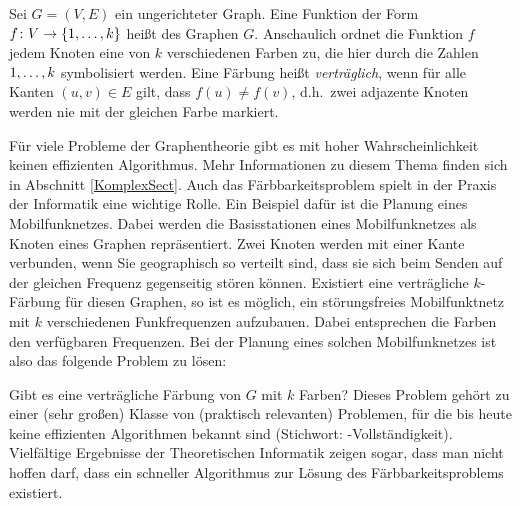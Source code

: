 \begin{definition}
Sei $G = (V,E)$ ein ungerichteter Graph. Eine Funktion der Form
$f \colon V \rightarrow \{1, \dots ,k\}$
heißt  des Graphen $G$. Anschaulich
ordnet die Funktion $f$ jedem Knoten eine von $k$ verschiedenen Farben
zu, die hier durch die Zahlen $1, \dots ,k$ symbolisiert werden. Eine
Färbung heißt \emph{verträglich}, wenn für
alle Kanten $(u,v) \in E$ gilt, dass $f(u) \neq f(v)$, d.h.~zwei
adjazente Knoten werden nie mit der gleichen Farbe markiert.
\end{definition}

\ifkomplex
Für viele Probleme der Graphentheorie gibt es mit hoher
Wahrscheinlichkeit keinen effizienten Algorithmus. Mehr Informationen
zu diesem Thema finden sich in Abschnitt \ref{KomplexSect}.
\else
Auch das Färbbarkeitsproblem spielt in der Praxis der Informatik eine
wichtige Rolle. Ein Beispiel dafür ist die Planung eines
Mobilfunknetzes. Dabei werden die Basisstationen eines Mobilfunknetzes
als Knoten eines Graphen repräsentiert. Zwei Knoten werden mit einer
Kante verbunden, wenn Sie geographisch so verteilt sind, dass sie sich
beim Senden auf der gleichen Frequenz gegenseitig stören
können. Existiert eine verträgliche $k$-Färbung für diesen Graphen, so
ist es möglich, ein störungsfreies Mobilfunktnetz mit $k$
verschiedenen Funkfrequenzen aufzubauen. Dabei entsprechen die Farben
den verfügbaren Frequenzen. Bei der Planung eines solchen
Mobilfunknetzes ist also das folgende Problem zu lösen:

\goodbreak
{}
{
Gibt es eine verträgliche Färbung von $G$ mit $k$ Farben?
}
Dieses Problem gehört zu einer (sehr großen) Klasse von (praktisch
relevanten) Problemen, für die bis heute keine effizienten Algorithmen
bekannt sind (Stichwort: \NP-Vollständigkeit). Vielfältige Ergebnisse 
der Theoretischen Informatik zeigen sogar, dass man nicht hoffen darf, 
dass ein schneller Algorithmus zur Lösung des Färbbarkeitsproblems existiert.
\fi
